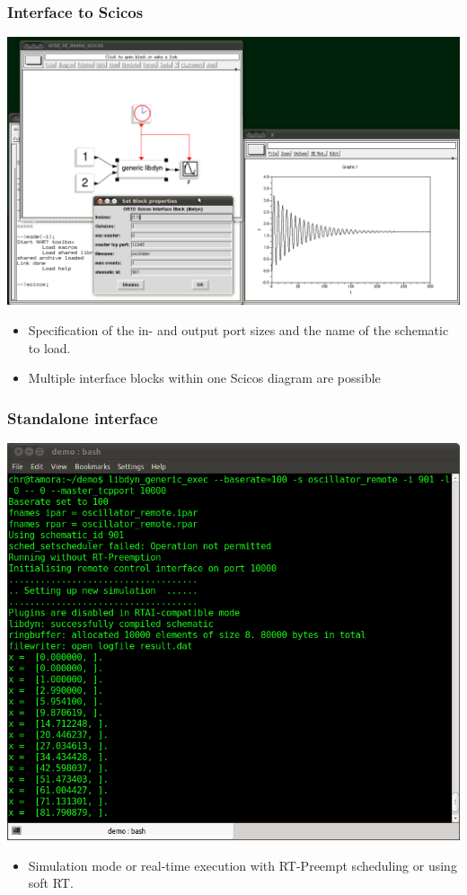 \documentclass[serif,9pt,xcolor=dvipsnames]{beamer}
\begin{document}
\begin{frame}[fragile]
  \frametitle{Interface to Scicos}

  \centering \includegraphics[trim=0mm 0mm 80mm 80mm, clip, width=1\linewidth]{figures/ortd_scicos_interface.png} 

  \begin{itemize}
   \item Specification of the in- and output port sizes and the name of the schematic to load.
   \item Multiple interface blocks within one Scicos diagram are possible
  \end{itemize}

\end{frame}


\begin{frame}[fragile]
  \frametitle{Standalone interface}

  \centering \includegraphics[trim=0mm 0mm 00mm 00mm, clip, width=0.8\linewidth]{figures/start_from_console.png} 

  \begin{itemize}
   \item Simulation mode or real-time execution with RT-Preempt scheduling or using soft RT.
  \end{itemize}

\end{frame}
\end{document}

